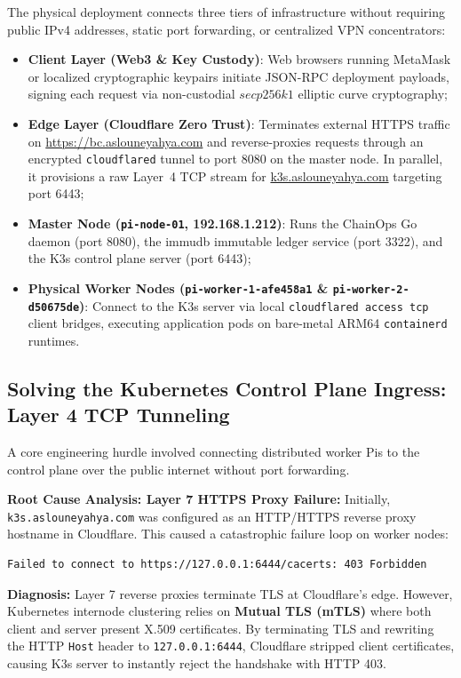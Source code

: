 \documentclass[a4paper,12pt]{article}
\begin{document}
The physical deployment connects three tiers of infrastructure without requiring public IPv4 addresses, static port forwarding, or centralized VPN concentrators:
\begin{itemize}[leftmargin=1.2cm]
    \item \textbf{Client Layer (Web3 \& Key Custody)}: Web browsers running MetaMask or localized cryptographic keypairs initiate JSON-RPC deployment payloads, signing each request via non-custodial $secp256k1$ elliptic curve cryptography;
    \item \textbf{Edge Layer (Cloudflare Zero Trust)}: Terminates external HTTPS traffic on \url{https://bc.aslouneyahya.com} and reverse-proxies requests through an encrypted \texttt{cloudflared} tunnel to port 8080 on the master node. In parallel, it provisions a raw Layer~4 TCP stream for \url{k3s.aslouneyahya.com} targeting port 6443;
    \item \textbf{Master Node (\texttt{pi-node-01}, 192.168.1.212)}: Runs the ChainOps Go daemon (port 8080), the immudb immutable ledger service (port 3322), and the K3s control plane server (port 6443);
    \item \textbf{Physical Worker Nodes (\texttt{pi-worker-1-afe458a1} \& \texttt{pi-worker-2-d50675de})}: Connect to the K3s server via local \texttt{cloudflared access tcp} client bridges, executing application pods on bare-metal ARM64 \texttt{containerd} runtimes.
\end{itemize}

\subsection{Solving the Kubernetes Control Plane Ingress: Layer 4 TCP Tunneling}

A core engineering hurdle involved connecting distributed worker Pis to the control plane over the public internet without port forwarding.

\begin{alertwarning}
\textbf{Root Cause Analysis: Layer 7 HTTPS Proxy Failure:}
Initially, \texttt{k3s.aslouneyahya.com} was configured as an HTTP/HTTPS reverse proxy hostname in Cloudflare. This caused a catastrophic failure loop on worker nodes:
\begin{lstlisting}
Failed to connect to https://127.0.0.1:6444/cacerts: 403 Forbidden
\end{lstlisting}
\textbf{Diagnosis:} Layer 7 reverse proxies terminate TLS at Cloudflare's edge. However, Kubernetes internode clustering relies on \textbf{Mutual TLS (mTLS)} where both client and server present X.509 certificates. By terminating TLS and rewriting the HTTP \texttt{Host} header to \texttt{127.0.0.1:6444}, Cloudflare stripped client certificates, causing K3s server to instantly reject the handshake with HTTP 403.
\end{alertwarning}
\end{document}
